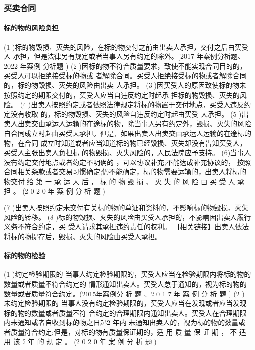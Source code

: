 \documentclass[UTF8,12pt]{ctexart}
\numberwithin{equation}{section} %
\numberwithin{figure}{section}
\numberwithin{table}{section}
\begin{document}
	\subsubsection{买卖合同}
	\paragraph{标的物的风险负担}
	(1 )标的物毁损、灭失的风险，在标的物交付之前由出卖人承担，交付之后由买受人
	承担，但是法律另有规定或者当事人另有约定的除外。(2017 年案例分析题、2022 年案例 分析题 )
	(2 )因标的物不符合质量要求，致使不能实现合同目的的，买受人可以拒绝接受标的物或 者解除合同。买受人拒绝接受标的物或者解除合同的，标的物毁损、灭失的风险由出卖 人承担。
	(3 )因买受人的原因致使标的物未按照约定的期限交付的，买受人应当自违反约定时起承 担标的物毁损、灭失的风险。
	(4 )出卖人按照约定或者依照法律规定将标的物置于交付地点，买受人违反约定没有收取 的，标的物毁损、灭失的风险自违反约定时起由买受 人承担。
	(5 )出卖人出卖交由承运人运输的在途标的物，除当事人另有约定外，毁损、灭失的风险 自合同成立时起由买受人承担。但是，如果出卖人出卖交由承运人运输的在途标的物，在合同 成立时知道或者应当知道标的物已经毁损、灭失却没有告知买受人，买受人主张出卖人负担标
	的物毁损、灭失风险的，人民法院应予支持。
	 (6)当事人没有约定交付地点或者约定不明确的 ，可以协议补充;不能达成补充协议的，
	按照合同相关条款或者交易习惯确定;仍不能确定，标的物需要运输的，出卖人将标的物交付 给 第 一 承 运 人 后 ， 标 的 物 毁 损 、 灭 失 的 风 险 由 买 受 人 承 担 。 (2 0 2 0 年 案 例 分 析 题 )
	
	(7 )出卖人按照约定未交付有关标的物的单证和资料的，不影响标的物毁损、灭失风险的转移。 
	(8 )标的物毁损、灭失的风险由买受人承担的，不影响因出卖人履行义务不符合约定，买 受人请求其承担违约责任的权利。
	【相关链接】出卖人依法将标的物提存后，毁损、灭失的风险由买受人承担。
	
	\paragraph{标的物的检验}
	(1 )约定检验期限的 当事人约定检验期限的，买受人应当在检验期限内将标的物的数量或者质量不符合约定的 情形通知出卖人。买受人怠于通知的，视为标的物的数量或者质量符合约定。(2015年案例分 析 题 、2 0 1 7 年 案 例 分 析 题 )
	(2 )未约定检验期限的 当事人没有约定检验期限的，买受人应当在发现或者应当发现标的物的数量或者质量不符 合约定的合理期限内通知出卖人。买受人在合理期限内未通知或者自收到标的物之日起2 年内 未通知出卖人的，视为标的物的数量或者质量符合约定;但是，对标的物有质量保证期的，适 用 质 量 保 证 期 ， 不 适 用 该 2 年 的 规 定 。 (2 0 2 0 年 案 例 分 析 题 )
	
\end{document}
